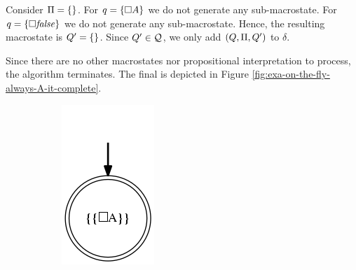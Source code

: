 \begin{example}
\begin{enumerate}
		Consider $\Pi = \{\}$. For $q = \{\Box A\}$ we do not generate any sub-macrostate. For $q = \{\Box \mathit{false}\}$ we do not generate any sub-macrostate.
		Hence, the resulting macrostate is $Q' = \{\}$. Since $Q'\in \mathcal{Q}$, we only add $(Q, \Pi, Q')$ to $\delta$.
		 
		Since there are no other macrostates nor propositional interpretation to process, the algorithm terminates. The final \DFA is depicted in Figure \ref{fig:exa-on-the-fly-always-A-it-complete}.
		
	\end{enumerate}

\begin{figure}[h]
	\centering
	\begin{subfigure}[b]{0.20\textwidth}
		\includegraphics[width=\textwidth]{images/on-the-fly-always-A-it-0}

\end{subfigure}
\end{figure}
\end{example}
